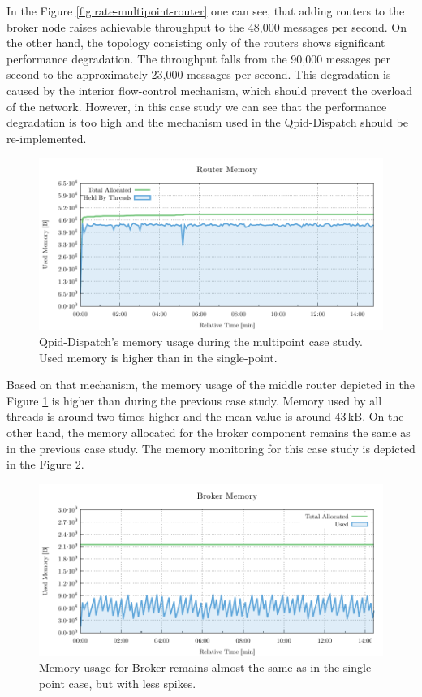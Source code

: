In the Figure \ref{fig:rate-multipoint-router} one can see, that adding routers to the broker node raises achievable throughput to the 48,000 messages per second. On the other hand, the topology consisting only of the routers shows significant performance degradation. The throughput falls from the 90,000 messages per second to the approximately 23,000 messages per second. This degradation is caused by the interior flow-control mechanism, which should prevent the overload of the network. However, in this case study we can see that the performance degradation is too high and the mechanism used in the Qpid-Dispatch should be re-implemented.


\begin{figure}[H]
	\centering
	\includegraphics[width=1\linewidth]{obrazky-figures/charts/multipoint-router-only-throughput-memory.pdf}
	\caption{Qpid-Dispatch's memory usage during the multipoint case study. Used memory is higher than in the single-point.}
	\label{fig:router-multipoint-memory}
\end{figure}

Based on that mechanism, the memory usage of the middle router depicted in the Figure \ref{fig:router-multipoint-memory} is higher than during the previous case study. Memory used by all threads is around two times higher and the mean value is around 43\,kB. On the other hand, the memory allocated for the broker component remains the same as in the previous case study. The memory monitoring for this case study is depicted in the Figure \ref{fig:broker-multipoint-memory}.

\begin{figure}[H]
	\centering
	\includegraphics[width=1\linewidth]{obrazky-figures/charts/multipoint-router-broker-throughput-memory.pdf}
	\caption{Memory usage for Broker remains almost the same as in the single-point case, but with less spikes.}
	\label{fig:broker-multipoint-memory}
\end{figure}


